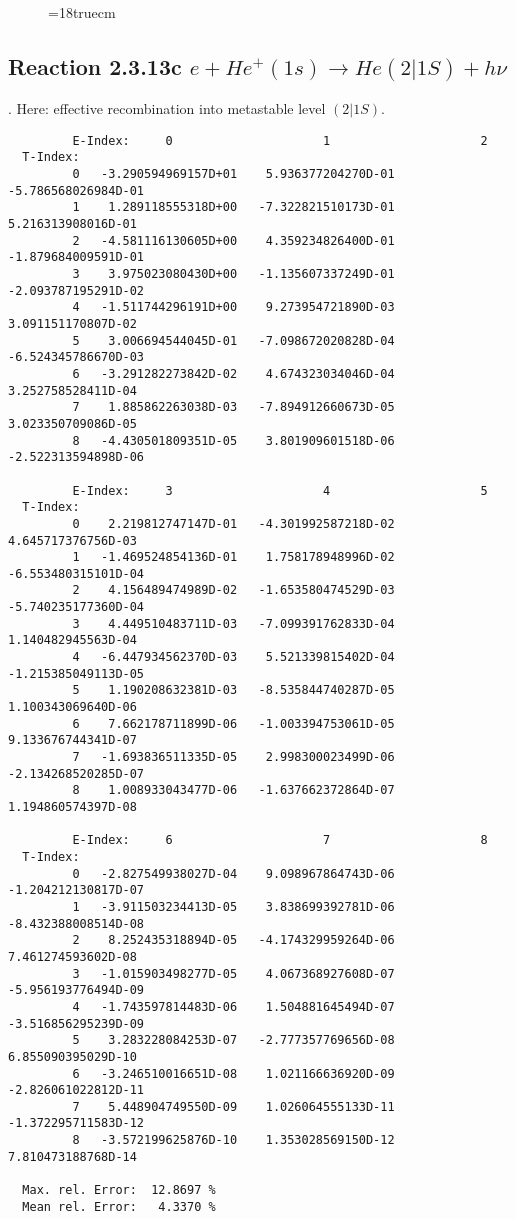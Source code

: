 \begin{figure} \label{2.3.13b}
\epsfxsize=18truecm
\end{figure}
\newpage

\subsection{
Reaction 2.3.13c $ e + He^+(1s) \rightarrow He(2|1S) + h\nu$
}

\cite{kn:Fujimoto}. Here: effective recombination into metastable level
$(2|1S)$.

\begin{verbatim}
         E-Index:     0                     1                     2
  T-Index:
         0   -3.290594969157D+01    5.936377204270D-01   -5.786568026984D-01
         1    1.289118555318D+00   -7.322821510173D-01    5.216313908016D-01
         2   -4.581116130605D+00    4.359234826400D-01   -1.879684009591D-01
         3    3.975023080430D+00   -1.135607337249D-01   -2.093787195291D-02
         4   -1.511744296191D+00    9.273954721890D-03    3.091151170807D-02
         5    3.006694544045D-01   -7.098672020828D-04   -6.524345786670D-03
         6   -3.291282273842D-02    4.674323034046D-04    3.252758528411D-04
         7    1.885862263038D-03   -7.894912660673D-05    3.023350709086D-05
         8   -4.430501809351D-05    3.801909601518D-06   -2.522313594898D-06

         E-Index:     3                     4                     5
  T-Index:
         0    2.219812747147D-01   -4.301992587218D-02    4.645717376756D-03
         1   -1.469524854136D-01    1.758178948996D-02   -6.553480315101D-04
         2    4.156489474989D-02   -1.653580474529D-03   -5.740235177360D-04
         3    4.449510483711D-03   -7.099391762833D-04    1.140482945563D-04
         4   -6.447934562370D-03    5.521339815402D-04   -1.215385049113D-05
         5    1.190208632381D-03   -8.535844740287D-05    1.100343069640D-06
         6    7.662178711899D-06   -1.003394753061D-05    9.133676744341D-07
         7   -1.693836511335D-05    2.998300023499D-06   -2.134268520285D-07
         8    1.008933043477D-06   -1.637662372864D-07    1.194860574397D-08

         E-Index:     6                     7                     8
  T-Index:
         0   -2.827549938027D-04    9.098967864743D-06   -1.204212130817D-07
         1   -3.911503234413D-05    3.838699392781D-06   -8.432388008514D-08
         2    8.252435318894D-05   -4.174329959264D-06    7.461274593602D-08
         3   -1.015903498277D-05    4.067368927608D-07   -5.956193776494D-09
         4   -1.743597814483D-06    1.504881645494D-07   -3.516856295239D-09
         5    3.283228084253D-07   -2.777357769656D-08    6.855090395029D-10
         6   -3.246510016651D-08    1.021166636920D-09   -2.826061022812D-11
         7    5.448904749550D-09    1.026064555133D-11   -1.372295711583D-12
         8   -3.572199625876D-10    1.353028569150D-12    7.810473188768D-14

  Max. rel. Error:  12.8697 %
  Mean rel. Error:   4.3370 %



\end{verbatim}
